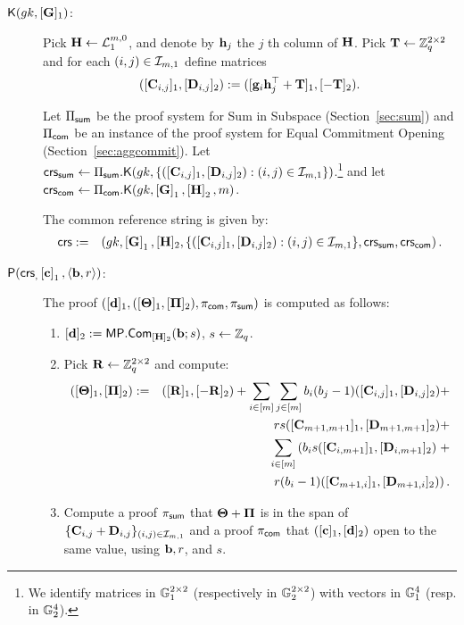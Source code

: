 \begin{description}
\item[{$\mathsf{K}({gk}, [\mathbf{{G}}]_1)$}:] 
Pick $\mathbf{{H}}\gets\mathcal{L}_1^{m,0}$, and denote by $\mathbf{h}_{j}$ the $j$ th column of $\mathbf{{H}}$. Pick $\mathbf{{T}}\gets\mathbb{Z}_q^{2\times 2}$ and for each $(i,j)\in\mathcal{I}_{m,1}$ define matrices
$$([\mathbf{{C}}_{i,j}]_1,[\mathbf{{D}}_{i,j}]_2):=([\mathbf{g}_i\mathbf{h}_j^{\top}+\mathbf{{T}}]_1,[-\mathbf{{T}}]_2).$$

Let $\Pi_{\mathsf{sum}}$ be the proof system for Sum in Subspace 
(Section~\ref{sec:sum}) and $\Pi_{\mathsf{com}}$
be an instance of the proof system for Equal Commitment Opening (Section~\ref{sec:aggcommit}).
Let
$\mathsf{crs}_{\mathsf{sum}} \gets \Pi_{\mathsf{sum}}.\mathsf{K}({gk}, \{([\mathbf{{C}}_{i,j}]_1,[\mathbf{{D}}_{i,j}]_2):(i,j)\in\mathcal{I}_{m,1}\})$.\footnote{We identify
matrices in $\mathbb{G}_1^{2 \times 2}$ (respectively in $\mathbb{G}_2^{2 \times 2}$) with vectors in $\mathbb{G}_1^{4}$ (resp. in $\mathbb{G}_2^{4}$).} and let $\mathsf{crs}_{\mathsf{com}} \gets \Pi_{\mathsf{com}}.\mathsf{K}({gk}, \left[\mathbf{{G}}\right]_1,\left[\mathbf{{H}}\right]_2,m)$. 

The common reference string is given by:
\begin{eqnarray*}
\mathsf{crs}&:=&\left( gk, \left[\mathbf{{G}}\right]_1,
    [\mathbf{{H}}]_2, \{([\mathbf{{C}}_{i,j}]_1, [\mathbf{{D}}_{i,j}]_2): (i,j) \in \mathcal{I}_{m,1}\},\mathsf{crs}_{\mathsf{sum}},\mathsf{crs}_{\mathsf{com}} \right).
 \end{eqnarray*}
\item[$\mathsf{P}(\mathsf{crs}_, \left[\mathbf{c}\right]_1, \langle \mathbf{b}, r \rangle)$:] The proof $([\mathbf{d}]_1,([\mathbf{{\Theta}}]_1,[\mathbf{{\Pi}}]_2),\pi_{\mathsf{com}},\pi_{\mathsf{sum}})$ is computed as follows:
\begin{enumerate}
\item $[\mathbf{d}]_2:= \mathsf{MP}.\mathsf{Com}_{[\mathbf{{H}}]_2} (\mathbf{b};s)$, $s \gets \mathbb{Z}_q$. 
\item Pick $\mathbf{{R}} \gets \mathbb{Z}_q^{2\times 2}$ and compute:
\begin{eqnarray*}
([\mathbf{{\Theta}}]_1, [\mathbf{{\Pi}}]_2) & := & ([\mathbf{{R}}]_1,[-\mathbf{{R}}]_2)+
\sum_{i\in[m]}\sum_{j\in[m]}b_i(b_j-1)([\mathbf{{C}}_{i,j}]_1,[\mathbf{{D}}_{i,j}]_2)+\\
& &     rs([\mathbf{{C}}_{m+1,m+1}]_1,[\mathbf{{D}}_{m+1,m+1}]_2)+\\
& &
  \sum_{i \in [m]}
 \left(b_i s  ([\mathbf{{C}}_{i,m+1}]_1,[\mathbf{{D}}_{i,m+1}]_2)\right. +\\
& & \left.r(b_i-1) ([\mathbf{{C}}_{m+1,i}]_1,[\mathbf{{D}}_{m+1,i}]_2)\right).
\end{eqnarray*}

\item Compute a proof $\pi_{\mathsf{sum}}$
that $\mathbf{{\Theta}}+\mathbf{{\Pi}}$ is in the span of 
$\{\mathbf{{C}}_{i,j}+\mathbf{{D}}_{i,j}\}_{(i,j)\in\mathcal{I}_{m,1}}$
and a proof $\pi_{\mathsf{com}}$
that
$([\mathbf{c}]_1,[\mathbf{d}]_2)$ open to the same value,
using $\mathbf{b},r$, and $s$. \\
\end{enumerate}


\end{description}

